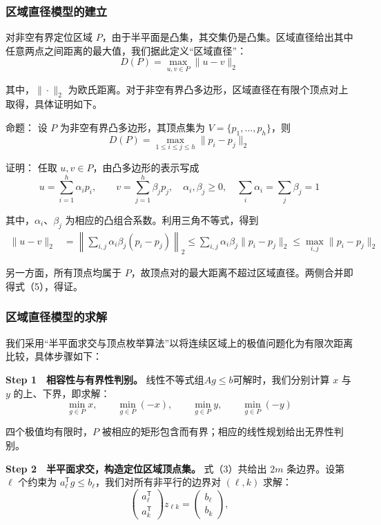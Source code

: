 \subsubsection{区域直径模型的建立}

对非空有界定位区域 \(P\)，由于半平面是凸集，其交集仍是凸集。区域直径给出其中任意两点之间距离的最大值，我们据此定义``区域直径''：
\[
D(P)=\max_{u,v\in P}\|u-v\|_2
\tag{4}
\]

其中，\(\|\cdot\|_2\) 为欧氏距离。对于非空有界凸多边形，区域直径在有限个顶点对上取得，具体证明如下。

\begin{propositionbox}
\noindent 命题： 设 \(P\) 为非空有界凸多边形，其顶点集为 \(V=\{p_1,\ldots,p_h\}\)，则
\[
D(P)=\max_{1\le i\le j\le h}\|p_i-p_j\|_2
\tag{5}
\]

\noindent 证明： 任取 \(u,v\in P\)，由凸多边形的表示写成
\[
u=\sum_{i=1}^{h}\alpha_i p_i,\qquad
v=\sum_{j=1}^{h}\beta_j p_j,
\quad \alpha_i,\beta_j\ge0,\quad
\sum_i\alpha_i=\sum_j\beta_j=1
\]

其中，\(\alpha_i\)、\(\beta_j\) 为相应的凸组合系数。利用三角不等式，得到
\[
\begin{aligned}
\|u-v\|_2
&=\left\|\sum_{i,j}\alpha_i\beta_j(p_i-p_j)\right\|_2
\le\sum_{i,j}\alpha_i\beta_j\|p_i-p_j\|_2
\le\max_{i,j}\|p_i-p_j\|_2
\end{aligned}
\]

另一方面，所有顶点均属于 \(P\)，故顶点对的最大距离不超过区域直径。两侧合并即得式（5），得证。
\end{propositionbox}

\subsubsection{区域直径模型的求解}

我们采用``半平面求交与顶点枚举算法''以将连续区域上的极值问题化为有限次距离比较，具体步骤如下：

\textbf{Step 1　相容性与有界性判别。} 线性不等式组\(Ag\le b\)可解时，我们分别计算 \(x\) 与 \(y\) 的上、下界，即求解：
\[
\min_{g\in P}x,\qquad\min_{g\in P}(-x),\qquad
\min_{g\in P}y,\qquad\min_{g\in P}(-y)
\tag{6}
\]

四个极值均有限时，\(P\) 被相应的矩形包含而有界；相应的线性规划给出无界性判别。

\textbf{Step 2　半平面求交，构造定位区域顶点集。} 式（3）共给出 \(2m\) 条边界。设第 \(\ell\) 个约束为 \(a_\ell^{\mathsf T}g\le b_\ell\)，我们对所有非平行的边界对 \((\ell,k)\) 求解：
\[
\begin{pmatrix}a_\ell^{\mathsf T}\\a_k^{\mathsf T}\end{pmatrix}z_{\ell k}
=\begin{pmatrix}b_\ell\\b_k\end{pmatrix},
\tag{7}
\]

